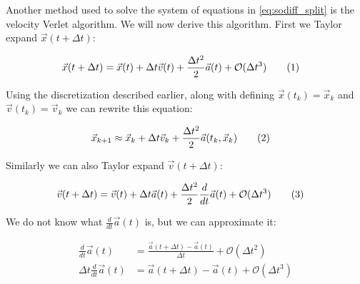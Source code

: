 \documentclass[reprint,english,notitlepage]{revtex4-1}  %
\newcommand\numberthis{\addtocounter{equation}{1}\tag{\theequation}}
\begin{document}



Another method used to solve the system of equations in \eqref{eq:sodiff_split} is the velocity Verlet algorithm. We will now derive this algorithm. First we Taylor expand $\vec{x}(t + \Delta t)$:

\begin{align*}
\vec{x}(t + \Delta t) &= \vec{x}(t) + \Delta t \vec{v}(t) + \frac{\Delta t^2}{2} \vec{a}(t) + \mathcal{O}(\Delta t^3) \numberthis \label{eq:so_taylorx}
\end{align*}

Using the discretization described earlier, along with defining $\vec{x}(t_k) = \vec{x}_k$ and $\vec{v}(t_k) = \vec{v}_k$ we can rewrite this equation: 

\begin{align*}
\vec{x}_{k + 1} &\approx \vec{x}_k + \Delta t \vec{v}_k + \frac{\Delta t^2}{2} \vec{a}(t_k,\vec{x}_k) \numberthis \label{eq:so_taylorx_disc}
\end{align*}

Similarly we can also Taylor expand $\vec{v}(t+\Delta t)$:

\begin{align*}
\vec{v}(t+\Delta t) &= \vec{v}(t) + \Delta t \vec{a}(t) + \frac{\Delta t^2}{2} \frac{d}{dt} \vec{a}(t) + \mathcal{O}(\Delta t^3) \numberthis \label{eq:so_taylorv}
\end{align*}

We do not know what $\frac{d}{dt} \vec{a}(t)$ is, but we can approximate it:

\begin{align*}
\frac{d}{dt}\vec{a}(t) &= \frac{\vec{a}(t+\Delta t) - \vec{a}(t)}{\Delta t} + \mathcal{O}(\Delta t^2) \\
\Delta t \frac{d}{dt} \vec{a}(t) &= \vec{a}(t+ \Delta t ) - \vec{a}(t) + \mathcal{O}(\Delta t^3) 
\end{align*}
\end{document}
